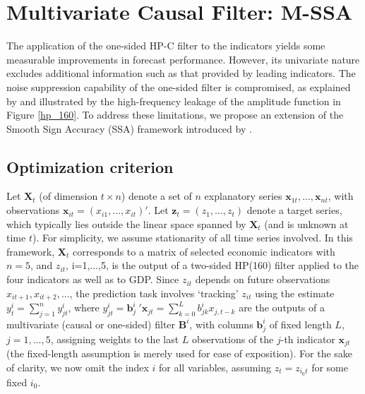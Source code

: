 \documentclass[11pt,a4paper]{article}
\begin{document}

\section{Multivariate Causal Filter: M-SSA}\label{sec:mSSA}

The application of the one-sided HP-C filter to the indicators yields some measurable improvements in forecast performance. However, its univariate nature excludes additional information such as that provided by leading indicators. The noise suppression capability of the one-sided filter is compromised, as explained by \cite{Wildi2025} and illustrated by the high-frequency leakage of the amplitude function in Figure \ref{hp_160}. To address these limitations, we propose an extension of the Smooth Sign Accuracy (SSA) framework introduced by \cite{Wildi2025}.

\subsection{Optimization criterion}

Let $\mathbf{X}_t$ (of dimension $t\times n$) denote a set of $n$ explanatory series $\mathbf{x}_{1t},...,\mathbf{x}_{nt}$, with observations $\mathbf{x}_{it}=(x_{i1},...,x_{it})'$. Let $\mathbf{z}_t=(z_{1},...,z_t)$  denote a target series, which typically lies outside the linear space spanned by $\mathbf{X}_t$  (and is unknown at time $t$). For simplicity, we assume stationarity of all time series involved. In this framework, $\mathbf{X}_t$ corresponds to a matrix of selected economic indicators with $n=5$, and $z_{it}$, i=1,...,5,   is the output of a two-sided HP(160) filter applied to the four indicators as well as to GDP. Since $z_{it}$  depends on future observations $x_{it+1},x_{it+2},...$, the prediction task involves `tracking' $z_{it}$  using the estimate $y^i_{t}=\sum_{j=1}^ny^i_{jt}$, where $y^i_{jt}=\mathbf{b}^i_j~'\mathbf{x}_{jt}=\sum_{k=0}^{L} b^i_{jk}x_{j,t-k}$ are the outputs of a multivariate (causal or one-sided) filter $\mathbf{B}^i$, with columns $\mathbf{b}^i_{j}$ of fixed length $L$, $j=1,...,5$, assigning weights to the last $L$ observations of the $j$-th indicator $\mathbf{x}_{jt}$ (the fixed-length assumption is merely used for ease of exposition).
For the sake of clarity, we now omit the index $i$ for all variables, assuming $z_t=z_{i_0t}$ for some fixed $i_0$.%
\end{document}
